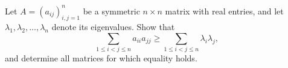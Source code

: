 \begin{problem}
    Let \( A = \left(a_{ij}\right)_{i,j=1}^{n} \) be a symmetric \( n \times n \) matrix with real entries, and let \( \lambda_{1}, \lambda_{2}, \ldots, \lambda_{n} \) denote its eigenvalues. Show that
    \[
        \sum_{1 \leq i < j \leq n} a_{ii} a_{jj} \geq \sum_{1 \leq i < j \leq n} \lambda_{i} \lambda_{j},
    \]
    and determine all matrices for which equality holds.
\end{problem}
